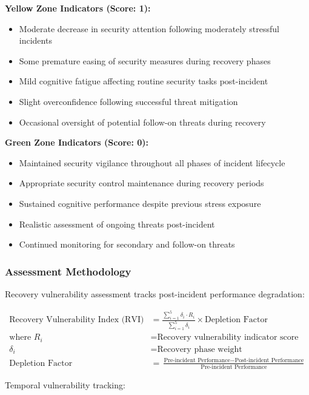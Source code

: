 \documentclass[11pt,a4paper]{article}
\begin{document}
\textbf{Yellow Zone Indicators (Score: 1):}
\begin{itemize}
\item Moderate decrease in security attention following moderately stressful incidents
\item Some premature easing of security measures during recovery phases
\item Mild cognitive fatigue affecting routine security tasks post-incident
\item Slight overconfidence following successful threat mitigation
\item Occasional oversight of potential follow-on threats during recovery
\end{itemize}

\textbf{Green Zone Indicators (Score: 0):}
\begin{itemize}
\item Maintained security vigilance throughout all phases of incident lifecycle
\item Appropriate security control maintenance during recovery periods
\item Sustained cognitive performance despite previous stress exposure
\item Realistic assessment of ongoing threats post-incident
\item Continued monitoring for secondary and follow-on threats
\end{itemize}

\subsubsection{Assessment Methodology}

Recovery vulnerability assessment tracks post-incident performance degradation:

\begin{align}
\text{Recovery Vulnerability Index (RVI)} &= \frac{\sum_{i=1}^{5} \delta_i \cdot R_i}{\sum_{i=1}^{5} \delta_i} \times \text{Depletion Factor} \\
\text{where } R_i &= \text{Recovery vulnerability indicator score} \\
\delta_i &= \text{Recovery phase weight} \\
\text{Depletion Factor} &= \frac{\text{Pre-incident Performance} - \text{Post-incident Performance}}{\text{Pre-incident Performance}}
\end{align}

Temporal vulnerability tracking:
\end{document}
